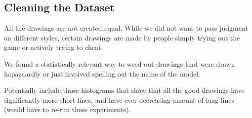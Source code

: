 \subsection{Cleaning the Dataset}
All the drawings are not created equal. While we did not want to pass judgment on different styles, certain drawings are made by people simply trying out the game or actively trying to cheat.

We found a statistically relevant way to weed out drawings that were drawn hapazaardly or just involved spelling out the name of the model.

Potentially include those histograms that show that all the good drawings have significantly more short lines, and have ever decreasing amount of long lines (would have to re-run these experiments).